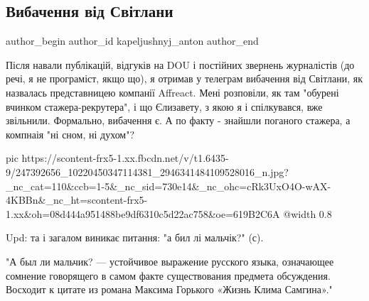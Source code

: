  
 
 
 
 
 
\subsection{Вибачення від Світлани}
\label{sec:21_10_2021.fb.kapeljushnyj_anton.1.izvinenie_svetlana}
 
\ifcmt
 author_begin
   author_id kapeljushnyj_anton
 author_end
\fi


Після навали публікацій, відгуків на DOU і постійних звернень журналістів (до
речі, я не програміст, якщо що), я отримав у телеграм вибачення від Світлани,
як назвалась представницею компанії Affreact. Мені розповіли, як там "обурені
вчинком стажера-рекрутера", і що Єлизавету, з якою я і спілкувався, вже
звільнили. Формально, вибачення є. А по факту - знайшли поганого стажера, а
компнаія "ні сном, ні духом"?

\ifcmt
  pic https://scontent-frx5-1.xx.fbcdn.net/v/t1.6435-9/247392656_10220450347114381_2946341484109528016_n.jpg?_nc_cat=110&ccb=1-5&_nc_sid=730e14&_nc_ohc=cRk3UxO4O-wAX-4KBBn&_nc_ht=scontent-frx5-1.xx&oh=08d444a951488be9df6310c5d22ac758&oe=619B2C6A
  @width 0.8
\fi

Upd: та і загалом виникає питання: "а бил лі мальчік?" (с).

\begin{cmtfront}

"А был ли мальчик? — устойчивое выражение русского языка, означающее сомнение
говорящего в самом факте существования предмета обсуждения. Восходит к цитате
из романа Максима Горького «Жизнь Клима Самгина»."

\end{cmtfront}

